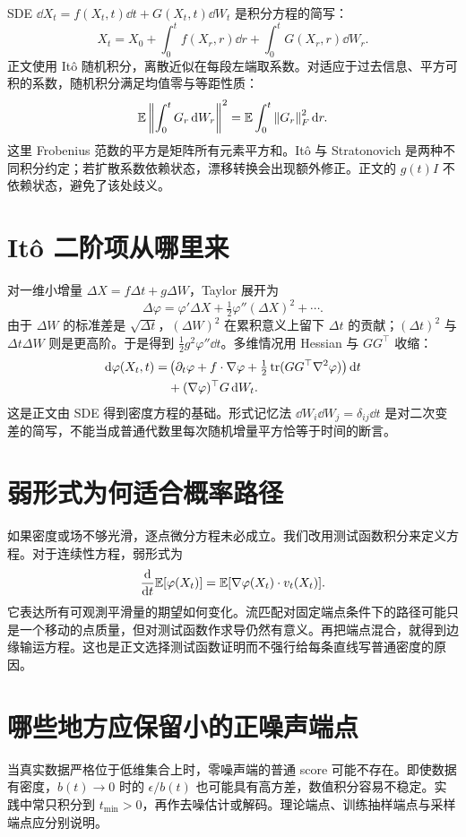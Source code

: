 SDE
$\dd X_t=f(X_t,t)\dd t+G(X_t,t)\dd W_t$
是积分方程的简写：
\begin{equation}
 X_t=X_0+\int_0^t f(X_r,r)\dd r+\int_0^t G(X_r,r)\dd W_r.
\end{equation}
正文使用 It\^o 随机积分，离散近似在每段左端取系数。对适应于过去信息、平方可积的系数，随机积分满足均值零与等距性质：
\begin{equation}
 \mathbb{E}\left\lVert\int_0^tG_r\mathop{}\!\mathrm{d} W_r\right\rVert^2
 =\mathbb{E}\int_0^t\left\lVert G_r\right\rVert_{F}^{2}\mathop{}\!\mathrm{d} r.
\end{equation}
这里 Frobenius 范数的平方是矩阵所有元素平方和。It\^o 与 Stratonovich 是两种不同积分约定；若扩散系数依赖状态，漂移转换会出现额外修正。正文的 $g(t)I$ 不依赖状态，避免了该处歧义。

\section{It\^o 二阶项从哪里来}
对一维小增量 $\Delta X=f\Delta t+g\Delta W$，Taylor 展开为
\begin{equation}
 \Delta\varphi=\varphi'\Delta X+\tfrac12\varphi''(\Delta X)^2+\cdots.
\end{equation}
由于 $\Delta W$ 的标准差是 $\sqrt{\Delta t}$，$(\Delta W)^2$ 在累积意义上留下 $\Delta t$ 的贡献；$(\Delta t)^2$ 与 $\Delta t\Delta W$ 则是更高阶。于是得到 $\tfrac12g^2\varphi''\dd t$。多维情况用 Hessian 与 $GG^\top$ 收缩：
\begin{align}
 \mathop{}\!\mathrm{d}\varphi(X_t,t)=&\left(\partial_t\varphi+f\cdot\nabla\varphi
 +\tfrac12\operatorname{tr}(GG^\top\nabla^2\varphi)\right)\mathop{}\!\mathrm{d} t\\
 &+(\nabla\varphi)^\top G\mathop{}\!\mathrm{d} W_t.
\end{align}
这是正文由 SDE 得到密度方程的基础。形式记忆法 $\dd W_i\dd W_j=\delta_{ij}\dd t$ 是对二次变差的简写，不能当成普通代数里每次随机增量平方恰等于时间的断言。

\section{弱形式为何适合概率路径}
如果密度或场不够光滑，逐点微分方程未必成立。我们改用测试函数积分来定义方程。对于连续性方程，弱形式为
\begin{equation}
 \frac{\mathop{}\!\mathrm{d}}{\mathop{}\!\mathrm{d} t}\mathbb{E}[\varphi(X_t)]
 =\mathbb{E}[\nabla\varphi(X_t)\cdot v_t(X_t)].
\end{equation}
它表达所有可观測平滑量的期望如何变化。流匹配对固定端点条件下的路径可能只是一个移动的点质量，但对测试函数作求导仍然有意义。再把端点混合，就得到边缘输运方程。这也是正文选择测试函数证明而不强行给每条直线写普通密度的原因。

\section{哪些地方应保留小的正噪声端点}
当真实数据严格位于低维集合上时，零噪声端的普通 score 可能不存在。即使数据有密度，$b(t)\to0$ 时的 $\epsilon/b(t)$ 也可能具有高方差，数值积分容易不稳定。实践中常只积分到 $t_{\min}>0$，再作去噪估计或解码。理论端点、训练抽样端点与采样端点应分别说明。

